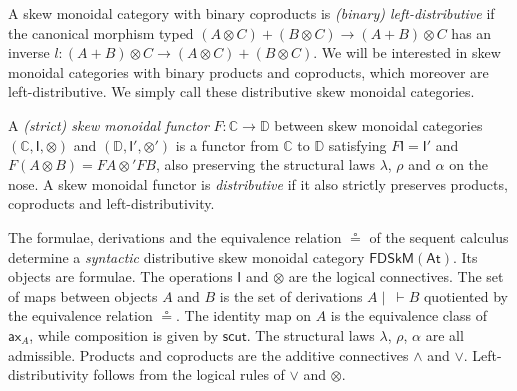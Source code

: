 \documentclass[submission,copyright,creativecommons]{eptcs}
\theoremstyle{definition}
\newcommand{\ax}{\mathsf{ax}}
\newcommand{\ot}{\otimes}
\newcommand{\I}{\mathsf{I}}
\newcommand{\FSkMCC}{\mathsf{FDSkM}}
\begin{document}
\begin{center}
\end{center}
A skew monoidal category with binary coproducts is \emph{(binary) left-distributive} if the canonical morphism typed $(A \ot C) + (B \ot C) \to (A + B) \ot C$ has an inverse $l : (A + B) \ot C \to (A \ot C) + (B \ot C)$. We will be interested in skew monoidal categories with binary products and coproducts, which moreover are left-distributive. We simply call these distributive skew monoidal categories.

A \emph{(strict) skew monoidal functor} $F : \mathbb{C} \rightarrow \mathbb{D}$ between skew monoidal categories $(\mathbb{C} , \I , \ot)$ and $(\mathbb{D} , \I' , \ot')$ is a functor from $\mathbb{C}$ to $\mathbb{D}$ satisfying
    $F \I = \I'$ and $F (A \ot B) = F A \ot' F B$, also preserving the structural laws $\lambda$, $\rho$ and $\alpha$ on the nose. A skew monoidal functor is \emph{distributive} if it also strictly preserves products, coproducts and left-distributivity.

The formulae, derivations and the equivalence relation $\circeq$ of the sequent calculus determine a \emph{syntactic} distributive skew monoidal category $\FSkMCC(\mathsf{At})$. Its objects are formulae. The operations $\I$ and $\ot$ are the logical connectives. The set of maps between objects $A$ and $B$ is the set of derivations $A \mid ~ \vdash B$ quotiented by the equivalence relation $\circeq$. The identity map on $A$ is the equivalence class of $\ax_A$, while composition is given by $\mathsf{scut}$. The structural laws $\lambda$, $\rho$, $\alpha$ are all admissible. Products and coproducts are the additive connectives $\land$ and $\lor$. Left-distributivity follows from the logical rules of $\lor$ and $\ot$.
\end{document}
